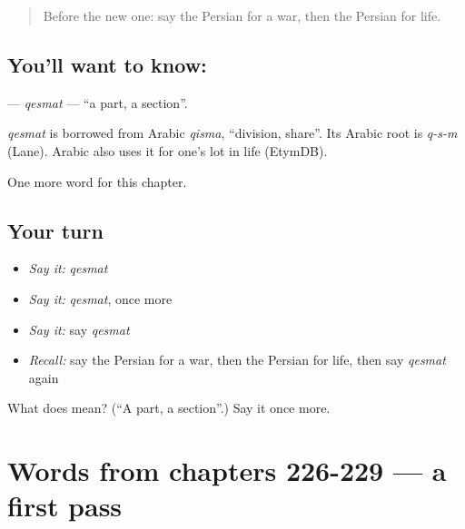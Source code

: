 \label{lesson:FA-C234-qesmat}



\begin{quote}
Before the new one: say the Persian for a war, then the Persian for life.
\end{quote}

\subsection*{You'll want to know: }
\textbf{} — \emph{qesmat} — \textquotedblleft{}a part, a section\textquotedblright{}.

\begin{cousinweb}
\emph{qesmat} is borrowed from Arabic \emph{qisma}, \textquotedblleft{}division, share\textquotedblright{}. Its Arabic root is \emph{q-s-m} (Lane). Arabic also uses it for one's lot in life (EtymDB).
\end{cousinweb}

\begin{grammarlens}[title={What you've built}]
One more word for this chapter.
\end{grammarlens}

\subsection*{Your turn}
\begin{itemize}
\raggedright
  \item \emph{Say it:} \emph{qesmat}
  \item \emph{Say it:} \emph{qesmat}, once more
  \item \emph{Say it:} say \emph{qesmat}
  \item \emph{Recall:} say the Persian for a war, then the Persian for life, then say \emph{qesmat} again
\end{itemize}

\begin{tcolorbox}[breakable,colback=teal!4,colframe=teal!35!black,title={Before you move on}]
What does  mean? (\textquotedblleft{}A part, a section\textquotedblright{}.) Say it once more.
\end{tcolorbox}
\section[(dialogue)]{Words from chapters 226-229 — a first pass}

\label{lesson:FA-R234-first-pass-words-from-chapters-226-229}



